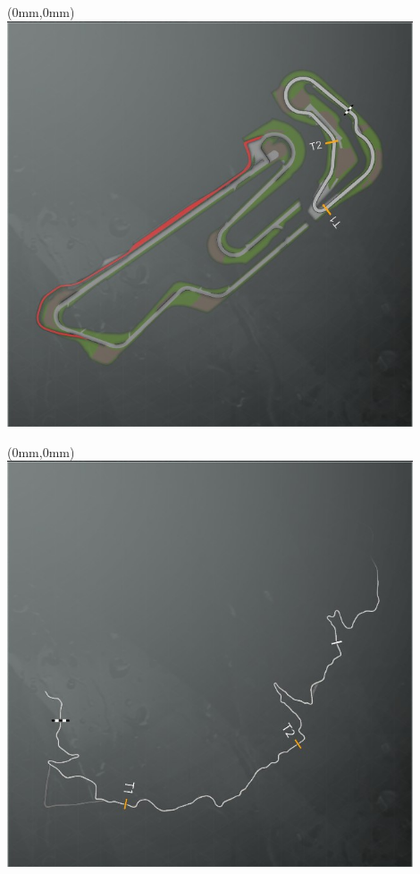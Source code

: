 \null\newpage
\begin{textblock*}{30mm}(0mm,0mm)%
\includegraphics[width=120mm]{TR/2015-05-20_00047.png}
\end{textblock*}
\null\newpage
\begin{textblock*}{30mm}(0mm,0mm)%
\includegraphics[width=120mm]{TR/2015-05-20_00014.png}
\end{textblock*}
